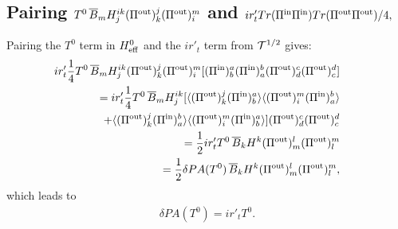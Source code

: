 \documentclass[aps,preprint,floats,epsf,epsfig,nofootinbib,letter]{revtex4}
\newcommand{\be}{\begin{eqnarray}}
\newcommand{\en}{\end{eqnarray}}
\newcommand{\T}{{\cal T}}
\newcommand{\la}{{\langle}}
\newcommand{\ra}{{\rangle}}
\newcommand{\non}{{\nonumber}}
\begin{document}
\subsection{Pairing $T^0\, \overline B_m H^{ik}_j (\Pi^{\rm out})^j_k (\Pi^{\rm out})^m_i$ and $ir'_t Tr(\Pi^{\rm in}\Pi^{\rm in})Tr(\Pi^{\rm out}\Pi^{\rm out})/4,
$}
Pairing the $T^0$ term in $H^0_{\rm eff}$ and the $ir'_t$ term from $\T^{1/2}$ gives:
\be
&&
\hspace{-1cm}
 ir'_t\frac{1}{4} T^0\, \overline B_m H^{ik}_j (\Pi^{\rm out})^j_k (\Pi^{\rm out})^m_i 
[(\Pi^{\rm in})^a_b(\Pi^{\rm in})^b_a (\Pi^{\rm out})^c_d(\Pi^{\rm out})^d_c]
\non\\
&&=ir'_t \frac{1}{4} T^0\, \overline B_m H^{ik}_j 
[\la (\Pi^{\rm out})^j_k (\Pi^{\rm in})^a_b\ra
\la (\Pi^{\rm out})^m_i (\Pi^{\rm in})^b_a\ra
\non\\
&&
\quad+
\la (\Pi^{\rm out})^j_k (\Pi^{\rm in})^b_a\ra
\la (\Pi^{\rm out})^m_i (\Pi^{\rm in})^a_b\ra]
(\Pi^{\rm out})^c_d(\Pi^{\rm out})^d_c
\non\\
&&= \frac{1}{2}i r'_t T^0\,\overline B_k H^k (\Pi^{\rm out})^l_m(\Pi^{\rm out})^m_l
\non\\
&&= \frac{1}{2}\delta PA(T^0)\,\overline B_k H^k (\Pi^{\rm out})^l_m(\Pi^{\rm out})^m_l,
\en
which leads to
\be
\delta PA(T^0)=i r'_t T^0.
\en
\end{document}
